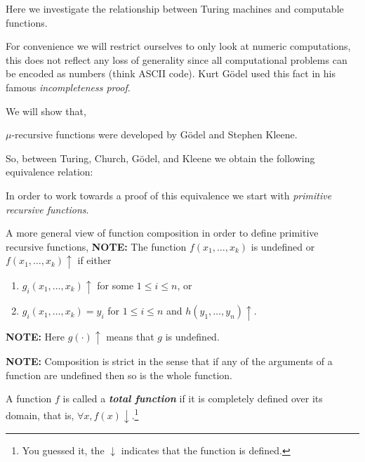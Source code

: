 \documentclass[a4paper,blends,pdf,colorBG,slideColor]{prosper}
\begin{document}
\small
Here we investigate the relationship between Turing machines and
computable functions.

For convenience we will restrict ourselves to only look at numeric computations, this
does not reflect any loss of generality since all computational problems can be
encoded as numbers (think ASCII code).  Kurt G\"{o}del used this fact in his famous
{\em incompleteness proof}.

We will show that,


$\mu$-recursive functions were developed by G\"{o}del and Stephen Kleene.  

So, between Turing, Church, G\"{o}del,
and Kleene we obtain the following equivalence relation:



In order to work towards a proof of this equivalence we start with {\em primitive recursive functions}.
\es

{\small
A more general view of function composition in order to define primitive recursive functions,
{\bf NOTE:} The function $f(x_1,\ldots,x_k) $ is undefined or $f(x_1,\ldots,x_k) \uparrow$ if either
\begin{enumerate}
\item $g_i(x_1,\ldots,x_k)\uparrow$ for some $1\le i \le n$, or
\item $g_i(x_1,\ldots,x_k) = y_i$ for $1\le i \le n$ and $h(y_1,\dots,y_n)\uparrow$.
\end{enumerate}

{\bf NOTE:} Here $g(\cdot)\uparrow$ means that $g$ is undefined.

{\bf NOTE:} Composition is strict in the sense that if any of the arguments of
a function are undefined then so is the whole function.

}
\es

A function $f$ is called a {\bf\em total function} if it is completely defined over its domain, that is, $\forall x, f(x)\downarrow$.\footnote{You guessed it, the $\downarrow$ indicates
that the function is defined.}
\end{document}
